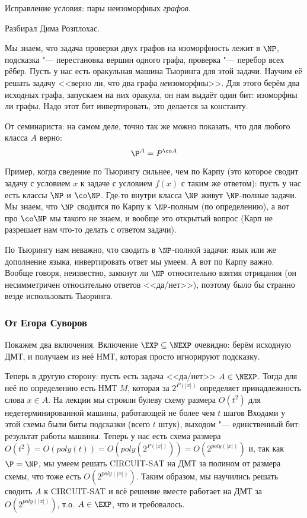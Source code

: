 	Исправление условия: пары неизоморфных \textit{графов}.

	Разбирал Дима Розплохас.

	Мы знаем, что задача проверки двух графов на изоморфность лежит в $\NP$,
	подсказка "--- перестановка вершин одного графа, проверка "--- перебор всех рёбер.
	Пусть у нас есть оракульная машина Тьюринга для этой задачи.
	Научим её решать задачу <<верно ли, что два графа \textit{не}изоморфны>>.
	Для этого берём два исходных графа, запускаем на них оракула, он нам выдаёт
	один бит: изоморфны ли графы.
	Надо этот бит инвертировать, это делается за константу.

	\begin{Rem}
		От семинариста: на самом деле, точно так же можно показать, что для любого
		класса $A$ верно:
		\[ \P^A = P^{\co A} \]
	\end{Rem}
	\begin{Rem}\label{task_14_rem_turing}
		Пример, когда сведение по Тьюрингу сильнее, чем по Карпу (это которое сводит задачу
		с условием $x$ к задаче с условием $f(x)$ с таким же ответом):
		пусть у нас есть классы $\NP$ и $\co\NP$.
		Где-то внутри класса $\NP$ живут $\NP$-полные задачи.
		Мы знаем, что $\NP$ сводится по Карпу к $\NP$-полным (по определению),
		а вот про $\co\NP$ мы такого не знаем, и вообще это открытый вопрос (Карп не разрешает нам что-то делать
		с ответом задачи).

		По Тьюрингу нам неважно, что сводить в $\NP$-полной задачи: язык или же дополнение языка,
		инвертировать ответ мы умеем.
		А вот по Карпу важно.
		Вообще говоря, неизвестно, замкнут ли $\NP$ относительно взятия отрицания (он несимметричен относительно
		ответов <<да/нет>>), поэтому было бы странно везде использовать Тьюринга.
	\end{Rem}

	\subsubsection{От Егора Суворов}
		Покажем два включения.
		Включение $\EXP \subseteq \NEXP$ очевидно: берём исходную ДМТ, и получаем
		из неё НМТ, которая просто игнорируют подсказку.

		Теперь в другую сторону: пусть есть задача <<да/нет>> $A \in \NEXP$.
		Тогда для неё по определению есть НМТ $M$, которая за $2^{P(|x|)}$ определяет
		принадлежность слова $x \in A$.
		На лекции мы строили булеву схему размера $O(t^2)$ для недетерминированной машины, работающей не более чем $t$ шагов
		Входами у этой схемы были биты подсказки (всего $t$ штук), выходом "--- единственный бит: результат работы машины.
		Теперь у нас есть схема размера $O(t^2)=O(poly(t))=O(poly(2^{P(|x|)}))=O(2^{poly(|x|)})$ и,
		так как $\P=\NP$, мы умеем решать CIRCUIT-SAT на ДМТ за полином от размера схемы, что тоже есть $O(2^{poly(|x|)})$.
		Таким образом, мы научились решать сводить $A$ к CIRCUIT-SAT и всё решение вместе работает на ДМТ
		за $O(2^{poly(|x|)})$, т.о. $A \in \EXP$, что и требовалось.

